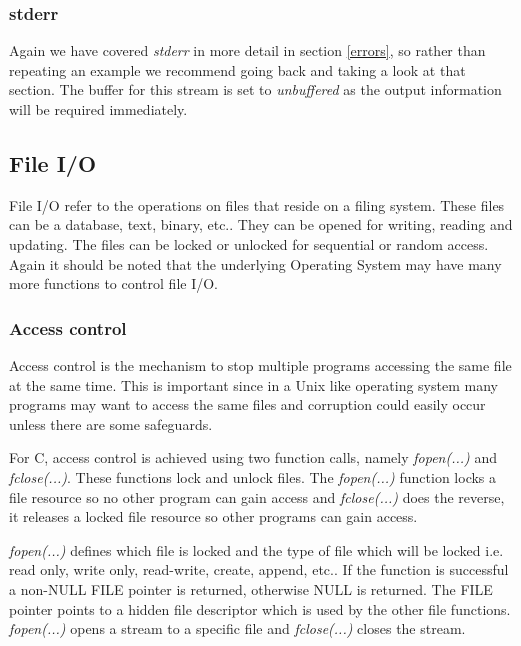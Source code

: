 \subsubsection{stderr}


Again we have covered \textit{stderr} in more detail in section \ref{errors}, so rather than repeating an example we recommend going back and taking a look at that section. The buffer for this stream is set to \textit{unbuffered} as the output information will be required immediately.

\subsection{File I/O}

File I/O refer to the operations on files that reside on a filing system. These files can be a database, text, binary, etc.. They can be opened for writing, reading and updating. The files can be locked or unlocked for  sequential or random access. Again it should be noted that the underlying Operating System may have many more functions to control file I/O.
  
\subsubsection{Access control}

Access control is the mechanism to stop multiple programs accessing the same file at the same time. This is important since in a Unix like operating system many programs may want to access the same files and corruption could easily occur unless there are some safeguards.


For C, access control is achieved using two function calls, namely \textit{fopen(...)} and \textit{fclose(...)}. These functions lock and unlock files. The \textit{fopen(...)} function locks a file resource so no other program can gain access and \textit{fclose(...)} does the reverse, it releases a locked file resource so other programs can gain access.
 
\textit{fopen(...)} defines which file is locked and the type of file which will be locked i.e. read only, write only, read-write, create, append, etc.. If the function is successful a non-NULL FILE pointer is returned, otherwise NULL is returned. The FILE pointer points to a hidden file descriptor which is used by the other file functions. \textit{fopen(...)} opens a stream to a specific file and \textit{fclose(...)} closes the stream.
 
